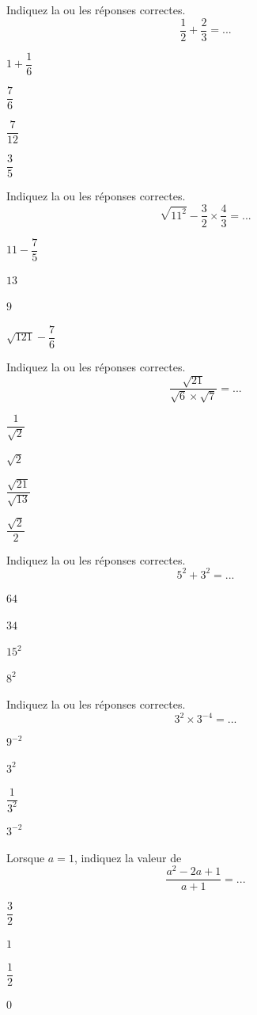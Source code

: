 \documentclass[a4paper,10pt]{article}
\begin{document}
\begin{qcm}

	\q{} Indiquez la ou les réponses correctes. $$ \dfrac{1}{2}+\dfrac{2}{3}=...$$
	\begin{choix2col}
		\item $1+\dfrac{1}{6}$
		\item $\dfrac{7}{6}$
		\item $\dfrac{7}{12}$
		\item $\dfrac{3}{5}$
	\end{choix2col}

	\q{} Indiquez la ou les réponses correctes. $$ \sqrt{11^2}-\dfrac{3}{2}\times\dfrac{4}{3}=...$$
	\begin{choix2col}
		\item $11-\dfrac{7}{5}$
		\item $13$
		\item $9$
		\item $\sqrt{121}-\dfrac{7}{6}$
	\end{choix2col}

	\q{} Indiquez la ou les réponses correctes. $$\dfrac{\sqrt{21}}{\sqrt{6}\times\sqrt{7}}=...$$
	\begin{choix2col}
		\item $\dfrac{1}{\sqrt{2}}$
		\item $\sqrt{2}$
		\item $\dfrac{\sqrt{21}}{\sqrt{13}}$
		\item $\dfrac{\sqrt{2}}{2}$
	\end{choix2col}

	\q{} Indiquez la ou les réponses correctes. $$5^2+3^2=...$$
	\begin{choix2col}
		\item $64$
		\item $34$
		\item $15^2$
		\item $8^2$
	\end{choix2col}

	\q{} Indiquez la ou les réponses correctes. $$3^2\times3^{-4}=...$$
	\begin{choix2col}
		\item $9^{-2}$
		\item $3^2$
		\item $\dfrac{1}{3^2}$
		\item $3^{-2}$
	\end{choix2col}

	\q{} Lorsque $a=1$, indiquez la valeur de $$\dfrac{a^2-2a+1}{a+1}=...$$
	\begin{choix2col}
		\item $\dfrac{3}{2}$
		\item $1$
		\item $\dfrac{1}{2}$
		\item $0$
	\end{choix2col}


\end{qcm}
\end{document}
